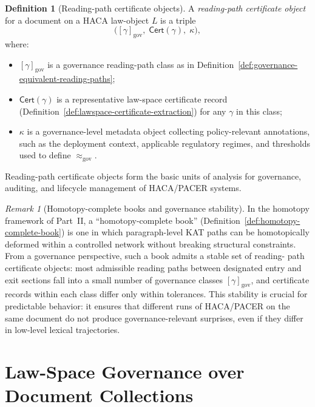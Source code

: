 \documentclass[11pt]{book}
\theoremstyle{plain}
\theoremstyle{definition}
\newtheorem{definition}[theorem]{Definition}
\theoremstyle{remark}
\newtheorem{remark}[theorem]{Remark}
\begin{document}
\begin{definition}[Reading-path certificate objects]
\label{def:reading-path-certificate-objects}
A \emph{reading-path certificate object} for a document on a HACA
law-object $L$ is a triple
\[
  \bigl([\gamma]_{\mathrm{gov}},\;\mathsf{Cert}(\gamma),\;\kappa\bigr),
\]
where:
\begin{itemize}
  \item $[\gamma]_{\mathrm{gov}}$ is a governance reading-path class
        as in Definition~\ref{def:governance-equivalent-reading-paths};
  \item $\mathsf{Cert}(\gamma)$ is a representative law-space
        certificate record (Definition~\ref{def:lawspace-certificate-extraction})
        for any $\gamma$ in this class;
  \item $\kappa$ is a governance-level metadata object collecting
        policy-relevant annotations, such as the deployment context,
        applicable regulatory regimes, and thresholds used to define
        $\approx_{\mathrm{gov}}$.
\end{itemize}
Reading-path certificate objects form the basic units of analysis for
governance, auditing, and lifecycle management of HACA/PACER systems.
\end{definition}

\begin{remark}[Homotopy-complete books and governance stability]
\label{rem:homotopy-complete-book-gov}
In the homotopy framework of Part~II, a ``homotopy-complete book''
(Definition~\ref{def:homotopy-complete-book}) is one in which
paragraph-level KAT paths can be homotopically deformed within a
controlled network without breaking structural constraints. From a
governance perspective, such a book admits a stable set of reading-
path certificate objects: most admissible reading paths between
designated entry and exit sections fall into a small number of
governance classes $[\gamma]_{\mathrm{gov}}$, and certificate
records within each class differ only within tolerances. This
stability is crucial for predictable behavior: it ensures that
different runs of HACA/PACER on the same document do not produce
governance-relevant surprises, even if they differ in low-level
lexical trajectories.
\end{remark}



\section[Law-Space Governance over Document Collections]{Law-Space Governance over Document Collections}
\end{document}
